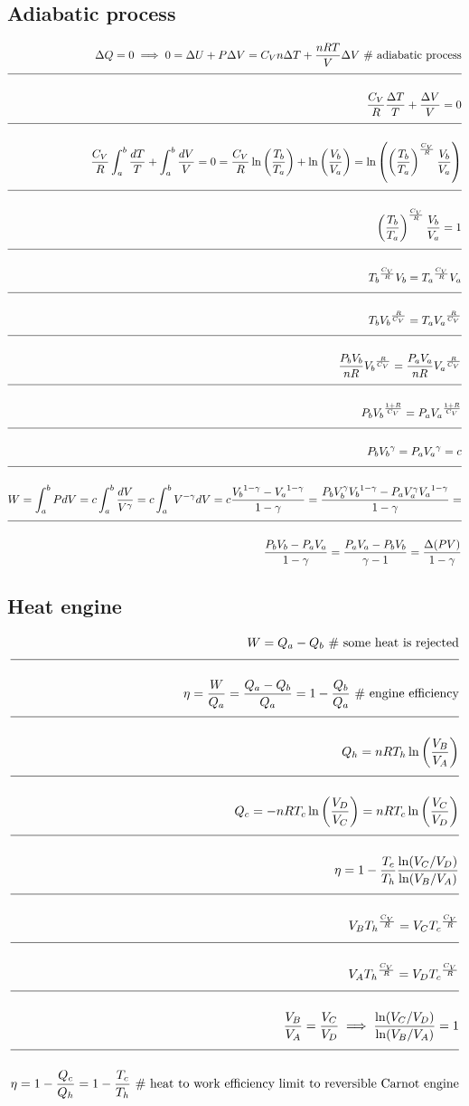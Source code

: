\documentclass[a4paper]{article}
\newcommand{\eqComment}[1]{\text{  \# #1}}
\newcommand{\n}{\\[1.5ex] \hline \nonumber \\[0ex]}
\begin{document}
\subsection{Adiabatic process}
\begin{tcolorbox}
\begin{align}
   \Delta Q = 0 \implies 0 = \Delta U + P \Delta V = C_V n \Delta T + \frac{n R T}{V} \Delta V \eqComment{adiabatic process}
\n \frac{C_V}{R} \frac{\Delta T}{T} + \frac{\Delta V}{V} = 0
\n \frac{C_V}{R} \int_a^b \frac{dT}{T} + \int_a^b\frac{dV}{V} = 0 = \frac{C_V}{R} \ln\left(\frac{T_b}{T_a}\right) + \ln\left(\frac{V_b}{V_a}\right) = \ln\left(\left(\frac{T_b}{T_a}\right)^\frac{C_V}{R} \frac{V_b}{V_a}\right)
\n \left(\frac{T_b}{T_a}\right)^\frac{C_V}{R} \frac{V_b}{V_a} = 1
\n {T_b}^\frac{C_V}{R} V_b = {T_a}^\frac{C_V}{R} V_a
\n T_b {V_b}^\frac{R}{C_V} = T_a {V_a}^\frac{R}{C_V}
\n \frac{P_b V_b}{n R} {V_b}^\frac{R}{C_V} = \frac{P_a V_a}{n R} {V_a}^\frac{R}{C_V}
\n P_b {V_b}^\frac{1 + R}{C_V} = P_a {V_a}^\frac{1 + R}{C_V}
\n P_b {V_b}^\gamma = P_a {V_a}^\gamma = c
\n W = \int_a^b P dV = c \int_a^b\frac{dV}{V^\gamma} = c \int_a^b V^{-\gamma} dV = c \frac{{V_b}^{1 - \gamma} - {V_a}^{1 - \gamma}}{1 - \gamma} = \frac{P_b V_b^\gamma {V_b}^{1 - \gamma} - P_a V_a^\gamma {V_a}^{1 - \gamma}}{1 - \gamma} = 
\n \frac{P_b V_b - P_a V_a}{1 - \gamma} = \frac{P_a V_a - P_b V_b}{\gamma - 1} = \frac{\Delta(P V)}{1 - \gamma}
\end{align}
\end{tcolorbox}

\subsection{Heat engine}
\begin{tcolorbox}
\begin{align}
   W = Q_a - Q_b \eqComment{some heat is rejected}
\n \eta = \frac{W}{Q_a} = \frac{Q_a - Q_b}{Q_a} = 1 - \frac{Q_b}{Q_a} \eqComment{engine efficiency}
\n Q_h = n R T_h \ln\left(\frac{V_B}{V_A}\right)
\n Q_c = - n R T_c \ln\left(\frac{V_D}{V_C}\right) = n R T_c \ln\left(\frac{V_C}{V_D}\right)
\n \eta = 1 - \frac{T_c}{T_h} \frac{\ln(V_C / V_D)}{\ln(V_B / V_A)}
\n V_B {T_h}^\frac{C_V}{R} = V_C {T_c}^\frac{C_V}{R}
\n V_A {T_h}^\frac{C_V}{R} = V_D {T_c}^\frac{C_V}{R}
\n \frac{V_B}{V_A} = \frac{V_C}{V_D} \implies \frac{\ln(V_C / V_D)}{\ln(V_B / V_A)} = 1
\n \eta = 1 - \frac{Q_c}{Q_h} = 1 - \frac{T_c}{T_h} \eqComment{heat to work efficiency limit to reversible Carnot engine}
\end{align}
\end{tcolorbox}
\end{document}
